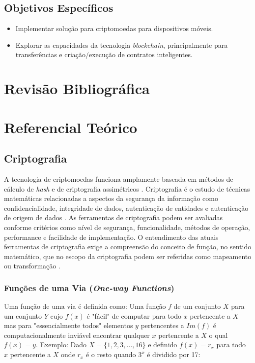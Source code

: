 \documentclass[
	article,			%
	11pt,				%
	oneside,			%
	a4paper,			%
	chapter=TITLE,		%
	section=TITLE,		%
	subsection=TITLE,	%
	subsubsection=TITLE, %
	english,			%
	brazil,				%
	sumario=tradicional
	]{ifrs-artigo-abntex2}
\begin{document}
\subsection{Objetivos Específicos}
\begin{itemize}
	\item Implementar solução para criptomoedas para dispositivos móveis.
	\item Explorar as capacidades da tecnologia \textit{blockchain}, principalmente para transferências e criação/execução de contratos inteligentes.
\end{itemize}

\section{Revisão Bibliográfica}

\section{Referencial Teórico}

\subsection{Criptografia}
A tecnologia de criptomoedas funciona amplamente baseada em métodos de cálculo de \textit{hash} e de criptografia assimétricos \cite{masterBit}. Criptografia é o estudo de técnicas matemáticas relacionadas a aspectos da segurança da informação como confidencialidade, integridade de dados, autenticação de entidades e autenticação de origem de dados \cite{katz1996handbook}.
As ferramentas de criptografia podem ser avaliadas conforme critérios como nível de segurança, funcionalidade, métodos de operação, performance e facilidade de implementação. O entendimento das atuais ferramentas de criptografia exige  a compreensão do conceito de função, no sentido matemático, que no escopo da criptografia podem ser referidas como mapeamento ou transformação \cite{katz1996handbook}.

\subsubsection{Funções de uma Via (\textit{One-way Functions})}
Uma função  de uma via é definida como: Uma função $f$ de um conjunto $X$ para um conjunto $Y$ cujo $f(x)$ é "fácil" de computar para todo $x$ pertencente a $X$ mas para "essencialmente todos" elementos $y$ pertencentes a $Im(f)$ é computacionalmente inviável encontrar qualquer $x$ pertencente a $X$ o qual $f(x) = y$. Exemplo: Dado $X = \{1,2,3,...,16\}$ e definido $f(x) = r_x$ para todo $x$ pertencente a $X$ onde $r_x$ é o resto quando $3^x$ é dividido por 17:
\end{document}
